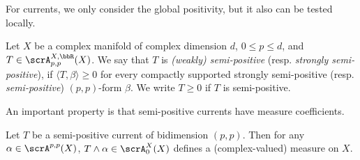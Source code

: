 For currents, we only consider the global positivity, but it also can be tested locally.

\begin{definition}[label=\labelNFM{def:positivity-of-currents}, status=draft, tag=0000000]
	Let $X$ be a complex manifold of complex dimension $d$, $0 \leq p \leq d$, and $T \in \scrA^{X,\bbR}_{p,p}(X)$.
  We say that $T$ is \emph{(weakly) semi-positive} (resp. \emph{strongly semi-positive}), if $\langle T,\beta\rangle \geq 0$ for every compactly supported strongly semi-positive (resp. \emph{semi-positive}) $(p,p)$-form $\beta$.
	We write $T \geq 0$ if $T$ is semi-positive.
\end{definition}

An important property is that semi-positive currents have measure coefficients.

\begin{proposition}[label=\labelNFM{prop:semi-positive-currents-has-measure-coefficients}, status=draft, tag=0000000, title={{{\cite[Chapter III, Proposition 1.14]{Demailly-2012-ComplexAnalyticDifferential}}}}]
  Let $T$ be a semi-positive current of bidimension $(p,p)$.
  Then for any $\alpha \in \scrA^{p,p}(X)$, $T \wedge \alpha \in \scrA_{0}^X(X)$ defines a (complex-valued) measure on $X$.
\end{proposition}



